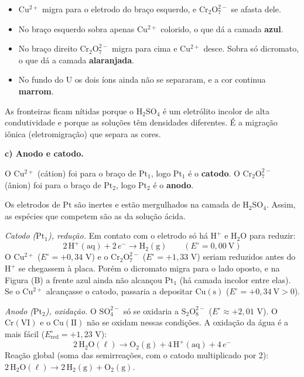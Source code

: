 \documentclass{article}%
\begin{document}
\begin{itemize}
\item $\mathrm{Cu^{2+}}$ migra para o eletrodo do braço esquerdo, e $\mathrm{Cr_2O_7^{2-}}$ se afasta dele.
\item No braço esquerdo sobra apenas $\mathrm{Cu^{2+}}$ colorido, o que dá a camada \textbf{azul}.
\item No braço direito $\mathrm{Cr_2O_7^{2-}}$ migra para cima e $\mathrm{Cu^{2+}}$ desce. Sobra só dicromato, o que dá a camada \textbf{alaranjada}.
\item No fundo do U os dois íons ainda não se separaram, e a cor continua \textbf{marrom}.
\end{itemize}

As fronteiras ficam nítidas porque o $\mathrm{H_2SO_4}$ é um eletrólito incolor de alta condutividade e porque as soluções têm densidades diferentes. É a migração iônica (eletromigração) que separa as cores.

\medskip
\textbf{c) Anodo e catodo.}

O $\mathrm{Cu^{2+}}$ (cátion) foi para o braço de $\mathrm{Pt_1}$, logo $\mathrm{Pt_1}$ é o \textbf{catodo}. O $\mathrm{Cr_2O_7^{2-}}$ (ânion) foi para o braço de $\mathrm{Pt_2}$, logo $\mathrm{Pt_2}$ é o \textbf{anodo}.

Os eletrodos de $\mathrm{Pt}$ são inertes e estão mergulhados na camada de $\mathrm{H_2SO_4}$. Assim, as espécies que competem são as da solução ácida.

\emph{Catodo ($\mathrm{Pt_1}$), redução.} Em contato com o eletrodo só há $\mathrm{H^+}$ e $\mathrm{H_2O}$ para reduzir:
\[
2\,\mathrm{H^+(aq)}+2\,e^-\longrightarrow \mathrm{H_2(g)}\qquad (E^\circ=0{,}00\ \mathrm{V})
\]
O $\mathrm{Cu^{2+}}$ ($E^\circ=+0{,}34$ V) e o $\mathrm{Cr_2O_7^{2-}}$ ($E^\circ=+1{,}33$ V) seriam reduzidos antes do $\mathrm{H^+}$ se chegassem à placa. Porém o dicromato migra para o lado oposto, e na Figura (B) a frente azul ainda não alcançou $\mathrm{Pt_1}$ (há camada incolor entre elas). Se o $\mathrm{Cu^{2+}}$ alcançasse o catodo, passaria a depositar $\mathrm{Cu(s)}$ ($E^\circ=+0{,}34\ \mathrm{V}>0$).

\emph{Anodo ($\mathrm{Pt_2}$), oxidação.} O $\mathrm{SO_4^{2-}}$ só se oxidaria a $\mathrm{S_2O_8^{2-}}$ ($E^\circ\approx+2{,}01$ V). O $\mathrm{Cr(VI)}$ e o $\mathrm{Cu(II)}$ não se oxidam nessas condições. A oxidação da água é a mais fácil ($E^\circ_{\mathrm{red}}=+1{,}23$ V):
\[
2\,\mathrm{H_2O(\ell)}\longrightarrow \mathrm{O_2(g)}+4\,\mathrm{H^+(aq)}+4\,e^-
\]
Reação global (soma das semirreações, com o catodo multiplicado por 2): $2\,\mathrm{H_2O(\ell)}\to 2\,\mathrm{H_2(g)}+\mathrm{O_2(g)}$.
\end{document}
